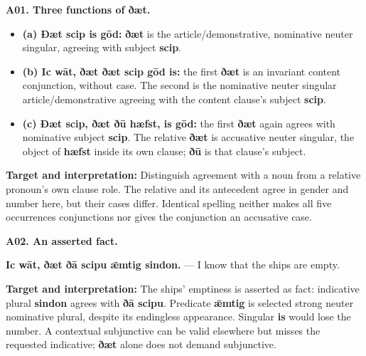 \par\begin{minipage}{\linewidth}\raggedright
\textbf{A01. Three functions of ðæt.}

\begin{itemize}
\item \textbf{(a) Ðæt scip is gōd:} \textbf{ðæt} is the article/\allowbreak{}demonstrative, nominative neuter singular, agreeing with subject \textbf{scip}.
\item \textbf{(b) Ic wāt, ðæt ðæt scip gōd is:} the first \textbf{ðæt} is an invariant content conjunction, without case. The second is the nominative neuter singular article/\allowbreak{}demonstrative agreeing with the content clause's subject \textbf{scip}.
\item \textbf{(c) Ðæt scip, ðæt ðū hæfst, is gōd:} the first \textbf{ðæt} again agrees with nominative subject \textbf{scip}. The relative \textbf{ðæt} is accusative neuter singular, the object of \textbf{hæfst} inside its own clause; \textbf{ðū} is that clause's subject.
\end{itemize}

\textbf{Target and interpretation:} Distinguish agreement with a noun from a relative pronoun's own clause role. The relative and its antecedent agree in gender and number here, but their cases differ. Identical spelling neither makes all five occurrences conjunctions nor gives the conjunction an accusative case.

\end{minipage}\par\addvspace{4pt}

\par\begin{minipage}{\linewidth}\raggedright
\textbf{A02. An asserted fact.}

\textbf{Ic wāt, ðæt ðā scipu ǣmtig sindon.} — I know that the ships are empty.

\textbf{Target and interpretation:} The ships' emptiness is asserted as fact: indicative plural \textbf{sindon} agrees with \textbf{ðā scipu}. Predicate \textbf{ǣmtig} is selected strong neuter nominative plural, despite its endingless appearance. Singular \textbf{is} would lose the number. A contextual subjunctive can be valid elsewhere but misses the requested indicative; \textbf{ðæt} alone does not demand subjunctive.

\end{minipage}\par\addvspace{4pt}

